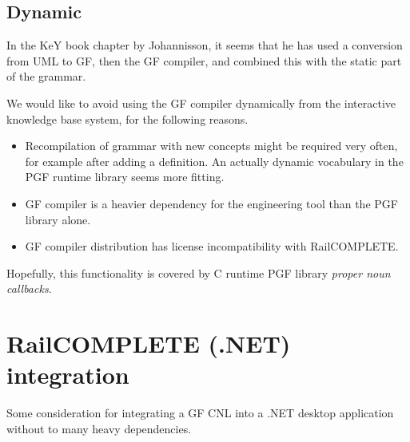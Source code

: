 \documentclass[]{article}
\providecommand{\tightlist}{%
  \setlength{\itemsep}{0pt}\setlength{\parskip}{0pt}}
\begin{document}
\subsection{Dynamic}\label{dynamic}

In the KeY book chapter by Johannisson, it seems that he has used a
conversion from UML to GF, then the GF compiler, and combined this with
the static part of the grammar.

We would like to avoid using the GF compiler dynamically from the
interactive knowledge base system, for the following reasons.

\begin{itemize}
\tightlist
\item
  Recompilation of grammar with new concepts might be required very
  often, for example after adding a definition. An actually dynamic
  vocabulary in the PGF runtime library seems more fitting.
\item
  GF compiler is a heavier dependency for the engineering tool than the
  PGF library alone.
\item
  GF compiler distribution has license incompatibility with
  RailCOMPLETE.
\end{itemize}

Hopefully, this functionality is covered by C runtime PGF library
\emph{proper noun callbacks}.

\pagebreak

\section{RailCOMPLETE (.NET)
integration}\label{railcomplete-.net-integration}

Some consideration for integrating a GF CNL into a .NET desktop
application without to many heavy dependencies.
\end{document}
